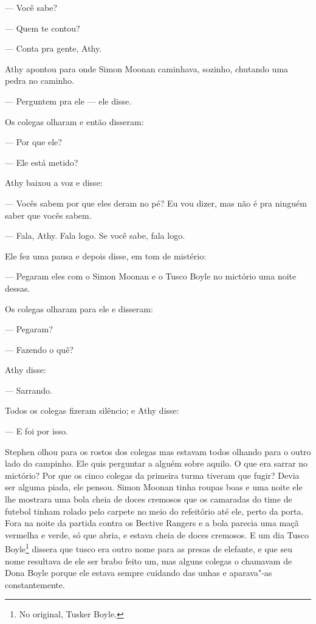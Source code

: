  --- Você sabe?

 --- Quem te contou?

 --- Conta pra gente, Athy.

Athy apontou para onde Simon Moonan caminhava, sozinho, chutando uma
pedra no caminho.

 --- Perguntem pra ele --- ele disse.

Os colegas olharam e então disseram:

 --- Por que ele?

 --- Ele está metido?

Athy baixou a voz e disse:

 --- Vocês sabem por que eles deram no pé? Eu vou dizer, mas não é pra
ninguém saber que vocês sabem.

 --- Fala, Athy. Fala logo. Se você sabe, fala logo.

Ele fez uma pausa e depois disse, em tom de mistério:

 --- Pegaram eles com o Simon Moonan e o Tusco Boyle no mictório uma noite
dessas.

Os colegas olharam para ele e disseram:

 --- Pegaram?

 --- Fazendo o quê?

Athy disse:

 --- Sarrando. 

Todos os colegas fizeram silêncio; e Athy disse:

 --- E foi por isso.

Stephen olhou para os rostos dos colegas mas estavam todos olhando para
o outro lado do campinho. Ele quis perguntar a alguém sobre aquilo. O
que era sarrar no mictório? Por que os cinco colegas da primeira turma
tiveram que fugir? Devia ser alguma piada, ele pensou. Simon Moonan
tinha roupas boas e uma noite ele lhe mostrara uma bola cheia de doces
cremosos que os camaradas do time de futebol tinham rolado pelo carpete
no meio do refeitório até ele, perto da porta. Fora na noite da partida
contra os Bective Rangers e a bola parecia uma maçã vermelha e verde,
só que abria, e estava cheia de doces cremosos. E um dia Tusco
Boyle\footnote{ No original, Tusker Boyle.} dissera que tusco era outro 
nome para as presas de elefante, e que seu nome resultava de ele ser brabo
feito um, mas alguns colegas o chamavam de Dona Boyle porque ele estava
sempre cuidando das unhas e aparava"-as constantemente.

